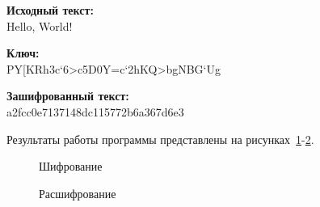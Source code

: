 \textbf{Исходный текст:} \\
    Hello, World!

\textbf{Ключ:} \\
    PY[KRh3c`6>c5D0Y=c`2hKQ>bgNBG`Ug

\textbf{Зашифрованный текст:} \\
    a2fcc0e7137148dc115772b6a367d6e3

Результаты работы программы представлены на рисунках~\ref{ris:encode-test-1}-\ref{ris:decode-test-1}.

\vspace{\baselineskip}
\begin{figure}[H]
    \caption{Шифрование}
\label{ris:encode-test-1}
\end{figure}

\vspace{\baselineskip}
\begin{figure}[H]
    \caption{Расшифрование}
\label{ris:decode-test-1}
\end{figure}
